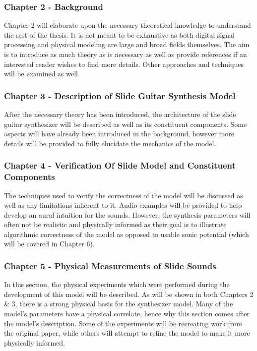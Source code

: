 \documentclass[../main.tex]{subfiles}
\begin{document}
\subsubsection{Chapter 2 - Background}
Chapter 2 will  elaborate upon the necessary theoretical knowledge to understand the rest of the thesis. It is not meant to be exhaustive as both digital signal processing and physical modeling are large and broad fields themselves. The aim is to introduce as much theory as is necessary as well as provide references if an interested reader wishes to find more details. Other approaches and techniques will be examined as well.

\subsubsection{Chapter 3 - Description of Slide Guitar Synthesis Model}
After the necessary theory has been introduced, the architecture of the slide guitar synthesizer will be described as well as its constituent components. Some aspects will have already been introduced in the background, however more details will be provided to fully elucidate the mechanics of the model.

\subsubsection{Chapter 4 - Verification Of Slide Model and Constituent Components}
The techniques used to verify the correctness of the model will be discussed as well as any limitations inherent to it. Audio examples will be provided to help develop an aural intuition for the sounds. However, the synthesis parameters will often not be realistic and physically informed as their goal is to illustrate algorithmic correctness of the model as opposed to usable sonic potential (which will be covered in Chapter 6).

\subsubsection{Chapter 5 - Physical Measurements of Slide Sounds}
In this section, the physical experiments which were performed during the development of this model will be described. As will be shown in both Chapters 2 \& 3, there is a strong physical basis for the synthesizer model. Many of the model's parameters have a physical correlate, hence why this section comes after the model's description. Some of the experiments will be recreating work from the original paper, while others will attempt to refine the model to make it more physically informed.
\end{document}
